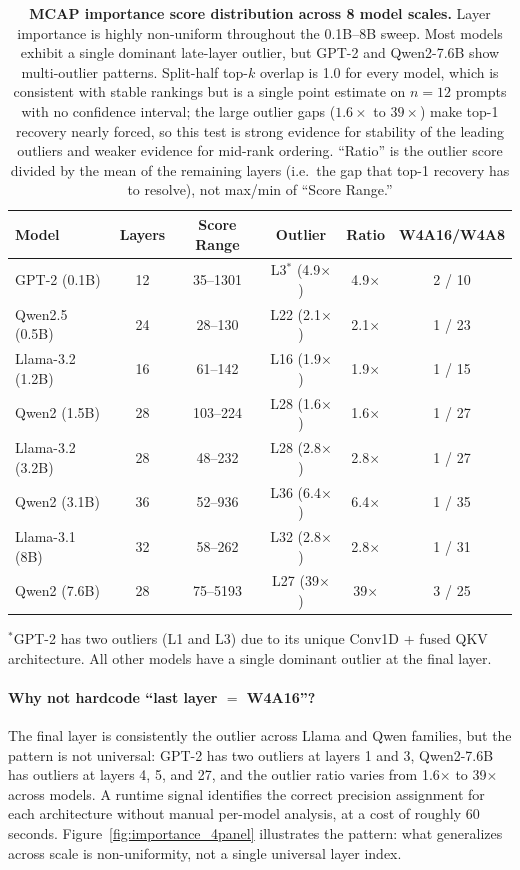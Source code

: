 \documentclass{article}
\begin{document}
\begin{table}[H]
\centering
\caption{\textbf{MCAP importance score distribution across 8 model scales.} Layer
importance is highly non-uniform throughout the 0.1B--8B sweep. Most models exhibit a
single dominant late-layer outlier, but GPT-2 and Qwen2-7.6B show multi-outlier patterns.
Split-half top-$k$ overlap is 1.0 for every model, which is consistent with stable
rankings but is a single point estimate on $n{=}12$ prompts with no confidence interval;
the large outlier gaps ($1.6\times$ to $39\times$) make top-1 recovery nearly forced, so
this test is strong evidence for stability of the leading outliers and weaker evidence
for mid-rank ordering. ``Ratio'' is the outlier score divided by the mean of the
remaining layers (i.e.\ the gap that top-1 recovery has to resolve), not max/min of
``Score Range.''}
\label{tab:mcap_scores}
\small
\begin{tabular}{lccccc}
\toprule
Model & Layers & Score Range & Outlier & Ratio & W4A16/W4A8 \\
\midrule
GPT-2 (0.1B) & 12 & 35--1301 & L3$^*$ (4.9$\times$) & 4.9$\times$ & 2 / 10 \\
Qwen2.5 (0.5B) & 24 & 28--130 & L22 (2.1$\times$) & 2.1$\times$ & 1 / 23 \\
Llama-3.2 (1.2B) & 16 & 61--142 & L16 (1.9$\times$) & 1.9$\times$ & 1 / 15 \\
Qwen2 (1.5B) & 28 & 103--224 & L28 (1.6$\times$) & 1.6$\times$ & 1 / 27 \\
Llama-3.2 (3.2B) & 28 & 48--232 & L28 (2.8$\times$) & 2.8$\times$ & 1 / 27 \\
Qwen2 (3.1B) & 36 & 52--936 & L36 (6.4$\times$) & 6.4$\times$ & 1 / 35 \\
Llama-3.1 (8B) & 32 & 58--262 & L32 (2.8$\times$) & 2.8$\times$ & 1 / 31 \\
Qwen2 (7.6B) & 28 & 75--5193 & L27 (39$\times$) & 39$\times$ & 3 / 25 \\
\bottomrule
\end{tabular}
\vspace{2pt}
{\footnotesize $^*$GPT-2 has two outliers (L1 and L3) due to its unique Conv1D + fused QKV
architecture. All other models have a single dominant outlier at the final layer.}
\end{table}

\paragraph{Why not hardcode ``last layer $=$ W4A16''?} The final layer is
consistently the outlier across Llama and Qwen families, but the pattern is not
universal: GPT-2 has two outliers at layers 1 and 3, Qwen2-7.6B has outliers at
layers 4, 5, and 27, and the outlier ratio varies from 1.6$\times$ to
39$\times$ across models. A runtime signal identifies the correct precision
assignment for each architecture without manual per-model analysis, at a cost
of roughly 60 seconds. Figure~\ref{fig:importance_4panel} illustrates the
pattern: what generalizes across scale is non-uniformity, not a single
universal layer index.
\end{document}
